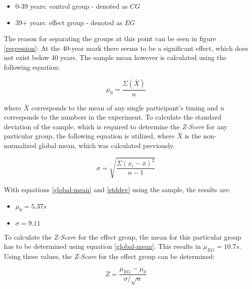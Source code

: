             \begin{itemize}
                \item 0-39 years: control group - denoted as $CG$
                \item 39+ years: effect group - denoted as $EG$
            \end{itemize}

            The reason for separating the groups at this point can be seen in figure \ref{regression}: At the 40-year mark there seems to be a significant effect, which does not exist below 40 years. The sample mean however is calculated using the following equation:

            \begin{equation}\label{global-mean}
                \mu_{0} = \frac{\Sigma(\bar{X})}{n}
            \end{equation}  

            where $\bar{X}$ corresponds to the mean of any single participant's timing and $n$ corresponds to the numbers in the experiment. To calculate the standard deviation of the sample, which is required to determine the \textit{Z-Score} for any particular group, the following equation is utilized, where $\bar{X}$ is the non-normalized global mean, which was calculated previously.

            \begin{equation}\label{stddev}
                \sigma = \sqrt{\frac{\Sigma(x_{i}-\bar{x})^{2}}{n-1}}
            \end{equation}  

            With equations \ref{global-mean} and \ref{stddev} using the sample, the results are:

            \begin{itemize}
                \item $\mu_{0} = 5.37s$
                \item $\sigma = 9.11$
            \end{itemize}

            To calculate the \textit{Z-Score} for the effect group, the mean for this particular group has to be determined using equation \ref{global-mean}. This results in $\mu_{EG} = 10.7s$. Using these values, the \textit{Z-Score} for the effect group can be determined:

            \begin{equation}\label{z-value}
                Z = \frac{\mu_{EG}-\mu_{0}}{\sigma/\sqrt{n}}
            \end{equation}  

